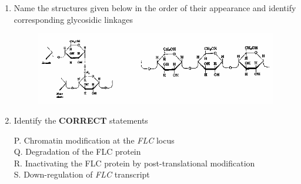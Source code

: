 \documentclass[journal,12pt,onecolumn]{IEEEtran}
\theoremstyle{remark}
\begin{document}
\begin{enumerate}
\begin{enumerate}
\end{enumerate}

\item Name the structures given below in the order of their appearance and identify corresponding glycosidic linkages

\begin{figure}[H]

\includegraphics[width=0.9\columnwidth]{fig24.png}
\caption*{}
\label{fig:q16}
\end{figure}
\hfill{}
\begin{enumerate}
\end{enumerate}

\item Identify the \textbf{CORRECT} statements


P. Chromatin modification at the \textit{FLC } locus \\
Q. Degradation of the FLC protein \\
R. Inactivating the FLC protein by post-translational modification \\
S. Down-regulation of \textit{FLC} transcript
\hfill{}
\begin{enumerate}
\end{enumerate}



\end{enumerate}
\end{document}
